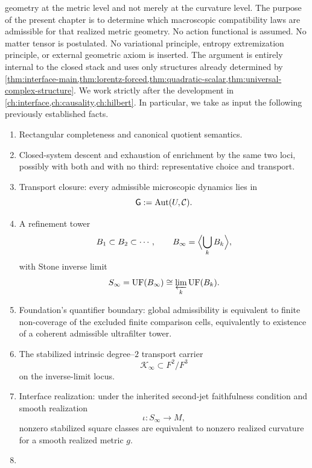 geometry at the metric level and not merely at the curvature level.
The purpose of the present chapter is to determine which macroscopic
compatibility laws are admissible for that realized metric geometry.
No action functional is assumed.
No matter tensor is postulated.
No variational principle, entropy extremization principle, or external
geometric axiom is inserted.
The argument is entirely internal to the closed stack and uses only
structures already determined by
\cref{thm:interface-main,thm:lorentz-forced,thm:quadratic-scalar,thm:universal-complex-structure}.
We work strictly after the development in
\cref{ch:interface,ch:causality,ch:hilbert}.
In particular, we take as input the following previously established
facts.
\begin{enumerate}[label=\textup{(S\arabic*)}]
	\item \label{ein:S1}
	      Rectangular completeness and canonical quotient semantics.
	\item \label{ein:S2}
	      Closed-system descent and exhaustion of enrichment by the same
	      two loci, possibly with both and with no third: representative
	      choice and transport.
	\item \label{ein:S3}
	      Transport closure:
	      every admissible microscopic dynamics lies in
	      \[
		      \mathsf G:=\operatorname{Aut}(U,\mathcal C).
	      \]
	\item \label{ein:S4}
	      A refinement tower
	      \[
		      B_1\subset B_2\subset \cdots,
		      \qquad
		      B_\infty=\Bigl\langle \bigcup_k B_k \Bigr\rangle,
	      \]
	      with Stone inverse limit
	      \[
		      S_\infty=\operatorname{UF}(B_\infty)\cong \varprojlim_k \operatorname{UF}(B_k).
	      \]
	\item \label{ein:S5}
	      Foundation's quantifier boundary:
	      global admissibility is equivalent to finite non-coverage of the
	      excluded finite comparison cells, equivalently to existence of a
	      coherent admissible ultrafilter tower.
	\item \label{ein:S6}
	      The stabilized intrinsic degree--\(2\) transport carrier
	      \[
		      \mathcal K_\infty\subset F^2/F^3
	      \]
	      on the inverse-limit locus.
	\item \label{ein:S7}
	      Interface realization:
	      under the inherited second-jet faithfulness condition and smooth
	      realization
	      \[
		      \iota:S_\infty\to M,
	      \]
	      nonzero stabilized square classes are equivalent to nonzero
	      realized curvature for a smooth realized metric \(g\).
	\item \label{ein:S8}

\end{enumerate}
